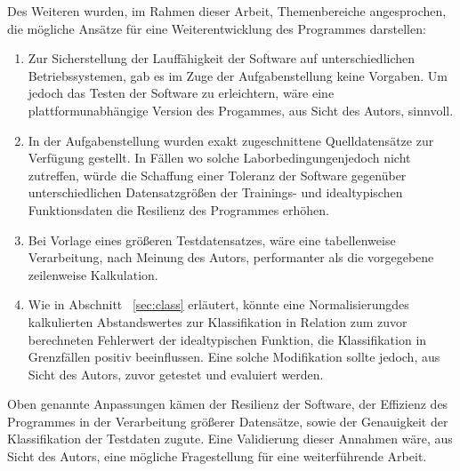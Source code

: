 Des Weiteren wurden, im Rahmen dieser Arbeit, Themenbereiche angesprochen, die mögliche Ansätze für eine Weiterentwicklung des Programmes darstellen:

\begin{enumerate}
 \itemsep0pt
 \item Zur Sicherstellung der Lauffähigkeit der Software auf unterschiedlichen Betriebssystemen, gab es im Zuge der Aufgabenstellung keine Vorgaben. Um jedoch das Testen der Software zu erleichtern, wäre eine plattformunabhängige Version des Progammes, aus Sicht des Autors, sinnvoll.
 \item In der Aufgabenstellung wurden exakt zugeschnittene Quelldatensätze zur Verfügung gestellt. In Fällen wo solche \glqq Laborbedingungen\grqq jedoch nicht zutreffen, würde die Schaffung einer Toleranz der Software gegenüber unterschiedlichen Datensatzgrößen der Trainings- und idealtypischen Funktionsdaten die Resilienz des Programmes erhöhen.
 \item Bei Vorlage eines größeren Testdatensatzes, wäre eine tabellenweise Verarbeitung, nach Meinung des Autors, performanter als die vorgegebene zeilenweise Kalkulation.
 \item Wie in Abschnitt ~\ref{sec:class} erläutert, könnte eine \glqq Normalisierung\grqq des kalkulierten Abstandswertes zur Klassifikation in Relation zum zuvor berechneten Fehlerwert der idealtypischen Funktion, die Klassifikation in Grenzfällen positiv beeinflussen. Eine solche Modifikation sollte jedoch, aus Sicht des Autors, zuvor getestet und evaluiert werden.
\end{enumerate}

Oben genannte Anpassungen kämen der Resilienz der Software, der Effizienz des Programmes in der Verarbeitung größerer Datensätze, sowie der Genauigkeit der Klassifikation der Testdaten zugute. Eine Validierung dieser Annahmen wäre, aus Sicht des Autors, eine mögliche Fragestellung für eine weiterführende Arbeit. 



